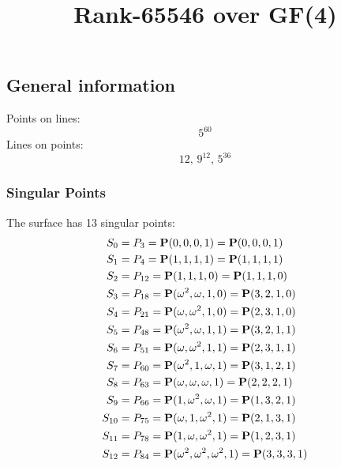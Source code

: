 \documentclass{article}
\newcommand\setTBstruts{\def\T{\rule{0pt}{2.6ex}}%
\def\B{\rule[-1.2ex]{0pt}{0pt}}}
\newcommand{\bP}{{\bf P}}
\begin{document}
 
\setTBstruts



{\allowdisplaybreaks%






\title{Rank-65546 over GF(4)}
\author{}%
\maketitle%
%
{}



\subsection*{General information}
Points on lines:
$$
5^{60}$$
Lines on points:
$$
12,\,9^{12},\,5^{36}$$
\subsubsection*{Singular Points}
The surface has 13 singular points:\\
\begin{align*}
S_{0} &= P_{3}=\bP(0, 0, 0, 1) = \bP(0, 0, 0, 1)\\
S_{1} &= P_{4}=\bP(1, 1, 1, 1) = \bP(1, 1, 1, 1)\\
S_{2} &= P_{12}=\bP(1, 1, 1, 0) = \bP(1, 1, 1, 0)\\
S_{3} &= P_{18}=\bP(\omega^{2}, \omega , 1, 0) = \bP(3, 2, 1, 0)\\
S_{4} &= P_{21}=\bP(\omega , \omega^{2}, 1, 0) = \bP(2, 3, 1, 0)\\
S_{5} &= P_{48}=\bP(\omega^{2}, \omega , 1, 1) = \bP(3, 2, 1, 1)\\
S_{6} &= P_{51}=\bP(\omega , \omega^{2}, 1, 1) = \bP(2, 3, 1, 1)\\
S_{7} &= P_{60}=\bP(\omega^{2}, 1, \omega , 1) = \bP(3, 1, 2, 1)\\
S_{8} &= P_{63}=\bP(\omega , \omega , \omega , 1) = \bP(2, 2, 2, 1)\\
S_{9} &= P_{66}=\bP(1, \omega^{2}, \omega , 1) = \bP(1, 3, 2, 1)\\
S_{10} &= P_{75}=\bP(\omega , 1, \omega^{2}, 1) = \bP(2, 1, 3, 1)\\
S_{11} &= P_{78}=\bP(1, \omega , \omega^{2}, 1) = \bP(1, 2, 3, 1)\\
S_{12} &= P_{84}=\bP(\omega^{2}, \omega^{2}, \omega^{2}, 1) = \bP(3, 3, 3, 1)\\
\end{align*}
}
\end{document}
